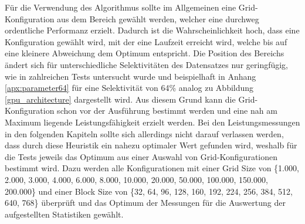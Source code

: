 Für die Verwendung des Algorithmus sollte im Allgemeinen eine Grid-Konfiguration aus dem Bereich gewählt werden, welcher eine durchweg ordentliche Performanz erzielt.
Dadurch ist die Wahrscheinlichkeit hoch, dass eine Konfiguration gewählt wird, mit der eine Laufzeit erreicht wird, welche bis auf eine kleinere Abweichung dem Optimum entspricht.
Die Position des Bereichs ändert sich für unterschiedliche Selektivitäten des Datensatzes nur geringfügig, wie in zahlreichen Tests untersucht wurde und beispielhaft in Anhang \ref{apx:parameter64} für eine Selektivität von 64\% analog zu Abbildung \ref{gpu_architecture} dargestellt wird.
Aus diesem Grund kann die Grid-Konfiguration schon vor der Ausführung bestimmt werden und eine nah am Maximum liegende Leistungsfähigkeit erzielt werden.
Bei den Leistungsmessungen in den folgenden Kapiteln sollte sich allerdings nicht darauf verlassen werden, dass durch diese Heuristik ein nahezu optimaler Wert gefunden wird, weshalb für die Tests jeweils das Optimum aus einer Auswahl von Grid-Konfigurationen bestimmt wird.
Dazu werden alle Konfigurationen mit einer Grid Size von \{1.000, 2.000, 3.000, 4.000, 6.000, 8.000, 10.000, 20.000, 50.000, 100.000, 150.000, 200.000\} und einer Block Size von \{32, 64, 96, 128, 160, 192, 224, 256, 384, 512, 640, 768\} überprüft und das Optimum der Messungen für die Auswertung der aufgestellten Statistiken gewählt.